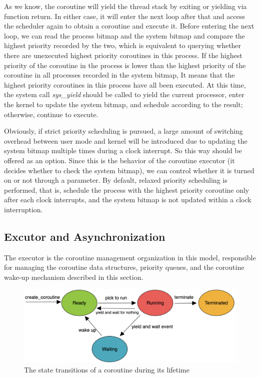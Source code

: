 \documentclass[10pt]{article}
\begin{document}
As we know, the coroutine will yield the thread stack by exiting or yielding via function return. In either case, it will enter the next loop after that and access the scheduler again to obtain a coroutine and execute it. Before entering the next loop, we can read the process bitmap and the system bitmap and compare the highest priority recorded by the two, which is equivalent to querying whether there are unexecuted highest priority coroutines in this process. If the highest priority of the coroutine in the process is lower than the highest priority of the coroutine in all processes recorded in the system bitmap, It means that the highest priority coroutines in this process have all been executed. At this time, the system call \textit{sys\_yield} should be called to yield the current processor, enter the kernel to update the system bitmap, and schedule according to the result; otherwise, continue to execute.

Obviously, if strict priority scheduling is pursued, a large amount of switching overhead between user mode and kernel will be introduced due to updating the system bitmap multiple times during a clock interrupt. So this way should be offered as an option. Since this is the behavior of the coroutine executor (it decides whether to check the system bitmap), we can control whether it is turned on or not through a parameter. By default, relaxed priority scheduling is performed, that is, schedule the process with the highest priority coroutine only after each clock interrupts, and the system bitmap is not updated within a clock interruption.


\subsection{Excutor and Asynchronization }

The executor is the coroutine management organization in this model, responsible for managing the coroutine data structures, priority queues, and the coroutine wake-up mechanism described in this section.

\begin{figure}[ht]
\begin{center}
\centerline{\includegraphics[width=\columnwidth]{states.png}}
\caption{The state transitions of a coroutine during its lifetime}
\label{states}
\end{center}
\end{figure}
\end{document}
